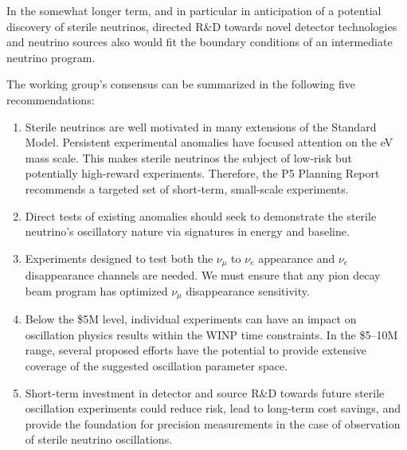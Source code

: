 In the somewhat longer term, and in particular in anticipation of a
potential discovery of sterile neutrinos, directed R\&D towards novel
detector technologies and neutrino sources also would fit the boundary
conditions of an intermediate neutrino program.

The working group's consensus can be summarized in the following five
recommendations:
\begin{enumerate}
\item{Sterile neutrinos are well motivated in many extensions of the
  Standard Model.  Persistent experimental anomalies have focused
  attention on the eV mass scale.  This makes sterile neutrinos the
  subject of low-risk but potentially high-reward experiments.  
  Therefore, the P5
  Planning Report recommends a targeted set of short-term, small-scale
  experiments.}
\item{Direct tests of existing anomalies should seek to demonstrate
  the sterile neutrino's oscillatory nature via signatures in energy
  and baseline.}
\item{Experiments designed to test both the $\nu_{\mu}$ to $\nu_e$
  appearance and $\nu_e$ disappearance channels are needed.  We must
  ensure that any pion decay beam program has optimized $\nu_{\mu}$
  disappearance sensitivity.}
\item{Below the \$5M level, individual experiments can have an impact on
  oscillation physics results within the WINP time constraints.  In
  the \$5--10M range, several proposed efforts have the potential to
  provide extensive coverage of the suggested oscillation parameter
  space.}
\item{Short-term investment in detector and source R\&D towards future
  sterile oscillation experiments could reduce risk, lead to long-term
  cost savings, and provide the foundation for precision measurements
  in the case of observation of sterile neutrino oscillations.}
\end{enumerate}
